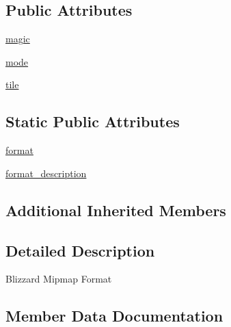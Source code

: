 \subsection*{Public Attributes}
\begin{DoxyCompactItemize}
\item 
\hyperlink{classPIL_1_1BlpImagePlugin_1_1BlpImageFile_ad1c7dc59100d2d982b2898140a9597db}{magic}
\item 
\hyperlink{classPIL_1_1BlpImagePlugin_1_1BlpImageFile_a838d6eed6756d7e94a55393ae08cf295}{mode}
\item 
\hyperlink{classPIL_1_1BlpImagePlugin_1_1BlpImageFile_aa8f837065336803fa6d607d3e12e44ed}{tile}
\end{DoxyCompactItemize}
\subsection*{Static Public Attributes}
\begin{DoxyCompactItemize}
\item 
\hyperlink{classPIL_1_1BlpImagePlugin_1_1BlpImageFile_ab299ebcd4c8123bad44d7474a3a9ab72}{format}
\item 
\hyperlink{classPIL_1_1BlpImagePlugin_1_1BlpImageFile_a2fa25e1942ee060854998738812f4cfa}{format\+\_\+description}
\end{DoxyCompactItemize}
\subsection*{Additional Inherited Members}


\subsection{Detailed Description}
\begin{DoxyVerb}Blizzard Mipmap Format
\end{DoxyVerb}
 

\subsection{Member Data Documentation}
\mbox{\label{classPIL_1_1BlpImagePlugin_1_1BlpImageFile_ab299ebcd4c8123bad44d7474a3a9ab72}} 

